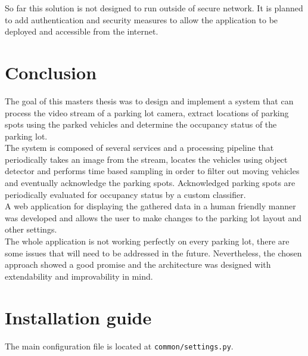 \documentclass[thesis=M,english]{FITthesis}[2019/03/06]
\begin{document}
So far this solution is not designed to run outside of secure network. It is planned to add authentication and security measures to allow the application to be deployed and accessible from the internet.\\







\chapter{Conclusion}
The goal of this masters thesis was to design and implement a system that can process the video stream of a parking lot camera, extract locations of parking spots using the parked vehicles and determine the occupancy status of the parking lot.\\

The system is composed of several services and a processing pipeline that periodically takes an image from the stream, locates the vehicles using object detector and performs time based sampling in order to filter out moving vehicles and eventually acknowledge the parking spots. Acknowledged parking spots are periodically evaluated for occupancy status by a custom classifier.\\

A web application for displaying the gathered data in a human friendly manner was developed and allows the user to make changes to the parking lot layout and other settings.\\

The whole application is not working perfectly on every parking lot, there are some issues that will need to be addressed in the future. Nevertheless, the chosen approach showed a good promise and the architecture was designed with extendability and improvability in mind.








\appendix
\chapter{Installation guide}

The main configuration file is located at \texttt{common/settings.py}.
\end{document}
